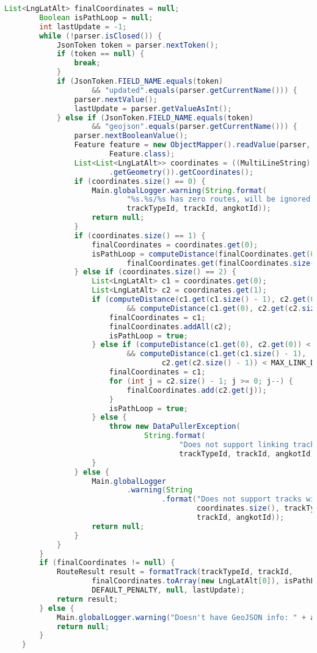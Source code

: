 \begin{lstlisting}[language=Java,basicstyle=\tiny,caption=DataPuller.java]
		List<LngLatAlt> finalCoordinates = null;
		Boolean isPathLoop = null;
		int lastUpdate = -1;
		while (!parser.isClosed()) {
			JsonToken token = parser.nextToken();
			if (token == null) {
				break;
			}
			if (JsonToken.FIELD_NAME.equals(token)
					&& "updated".equals(parser.getCurrentName())) {
				parser.nextValue();
				lastUpdate = parser.getValueAsInt();
			} else if (JsonToken.FIELD_NAME.equals(token)
					&& "geojson".equals(parser.getCurrentName())) {
				parser.nextBooleanValue();
				Feature feature = new ObjectMapper().readValue(parser,
						Feature.class);
				List<List<LngLatAlt>> coordinates = ((MultiLineString) feature
						.getGeometry()).getCoordinates();
				if (coordinates.size() == 0) {
					Main.globalLogger.warning(String.format(
							"%s.%s/%s has zero routes, will be ignored.",
							trackTypeId, trackId, angkotId));
					return null;
				}
				if (coordinates.size() == 1) {
					finalCoordinates = coordinates.get(0);
					isPathLoop = computeDistance(finalCoordinates.get(0),
							finalCoordinates.get(finalCoordinates.size() - 1)) < MAX_LINK_DISTANCE;
				} else if (coordinates.size() == 2) {
					List<LngLatAlt> c1 = coordinates.get(0);
					List<LngLatAlt> c2 = coordinates.get(1);
					if (computeDistance(c1.get(c1.size() - 1), c2.get(0)) < MAX_LINK_DISTANCE
							&& computeDistance(c1.get(0), c2.get(c2.size() - 1)) < MAX_LINK_DISTANCE) {
						finalCoordinates = c1;
						finalCoordinates.addAll(c2);
						isPathLoop = true;
					} else if (computeDistance(c1.get(0), c2.get(0)) < MAX_LINK_DISTANCE
							&& computeDistance(c1.get(c1.size() - 1),
									c2.get(c2.size() - 1)) < MAX_LINK_DISTANCE) {
						finalCoordinates = c1;
						for (int j = c2.size() - 1; j >= 0; j--) {
							finalCoordinates.add(c2.get(j));
						}
						isPathLoop = true;
					} else {
						throw new DataPullerException(
								String.format(
										"Does not support linking tracks that far away: %s.%s/%s ",
										trackTypeId, trackId, angkotId));
					}
				} else {
					Main.globalLogger
							.warning(String
									.format("Does not support tracks with %d routes: %s.%s/%s ",
											coordinates.size(), trackTypeId,
											trackId, angkotId));
					return null;
				}
			}
		}
		if (finalCoordinates != null) {
			RouteResult result = formatTrack(trackTypeId, trackId,
					finalCoordinates.toArray(new LngLatAlt[0]), isPathLoop,
					DEFAULT_PENALTY, null, lastUpdate);
			return result;
		} else {
			Main.globalLogger.warning("Doesn't have GeoJSON info: " + angkotId);
			return null;
		}
	}


\end{lstlisting}
